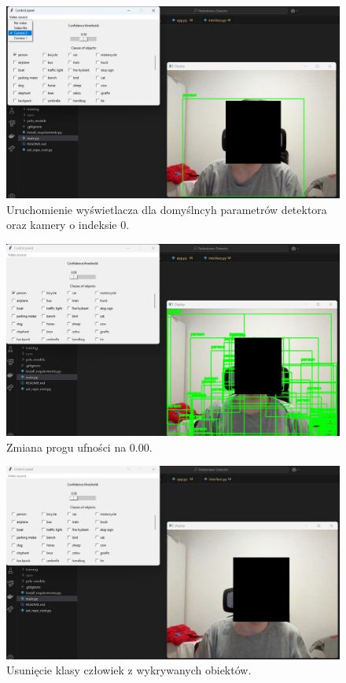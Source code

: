 \begin{figure}[H]
    \centering
    \includegraphics[width=\linewidth]{r_implementacja/panel_sterowania/camera_50.jpg}
    \caption{Uruchomienie wyświetlacza dla domyślncyh parametrów detektora oraz kamery o indeksie 0.}
    \label{fig:mockup-3}
\end{figure}

\begin{figure}[H]
    \centering
    \includegraphics[width=\linewidth]{r_implementacja/panel_sterowania/camera_0.jpg}
    \caption{Zmiana progu ufności na 0.00.}
    \label{fig:mockup-4}
\end{figure}

\begin{figure}[H]
    \centering
    \includegraphics[width=\linewidth]{r_implementacja/panel_sterowania/camera_no_person.jpg}
    \caption{Usunięcie klasy człowiek z wykrywanych obiektów.}
    \label{fig:mockup-5}
\end{figure}
